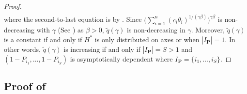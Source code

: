 \documentclass[12pt]{article}
\theoremstyle{plain}
\theoremstyle{plain}
\theoremstyle{definition}
\begin{document}
\begin{proof}
\begin{align*}
\end{align*}
where the second-to-last equation is by . Since  $\bigl(\sum_{i=1}^n (c_i\theta_i)^{1/(\gamma\beta)}\bigr)^{\gamma\beta}$ is non-decreasing with $\gamma$ (See ) as $\beta>0$, $\tilde{q}(\gamma)$ is non-decreasing in $\gamma$.
Moreover, $\tilde{q}(\gamma)$ is a constant if and only if $H^*$ is only distributed on axes or when $|I_{\mathbf{P}}|=1$. In other words, $\tilde{q}(\gamma)$ is increasing if and only if $|I_{\mathbf{P}}|=S>1$ and $(1-P_{i_1},\dots,1-P_{i_S})$ is asymptotically dependent where $I_{\mathbf{P}}=\{i_1,\dots,i_S\}$. 
\end{proof}

\subsection{Proof of }
\label{subsec:proof-bonferroni-conservative}
\BonferroniConservative*
\end{document}
